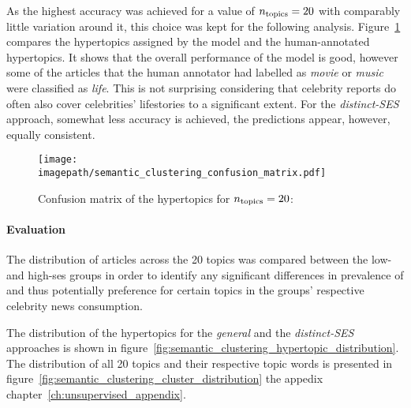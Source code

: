 As the highest accuracy was achieved for a value of $n_\text{topics}=20$ with comparably little variation around it, this choice was kept for the following analysis. Figure~\ref{fig:embedding_confusion_matrix} compares the hypertopics assigned by the model and the human-annotated hypertopics. It shows that the overall performance of the model is good, however some of the articles that the human annotator had labelled as \textit{movie} or \textit{music} were classified as \textit{life}. This is not surprising considering that celebrity reports do often also cover celebrities' lifestories to a significant extent. For the \textit{distinct-SES} approach, somewhat less accuracy is achieved, the predictions appear, however, equally consistent.

\begin{figure}
    \centering
    \texttt{[image: \\imagepath/semantic\_clustering\_confusion\_matrix.pdf]}
    \caption{Confusion matrix of the hypertopics for $n_\text{topics}=20$:}\label{fig:embedding_confusion_matrix}
\end{figure}

\paragraph{Evaluation}
The distribution of articles across the \SI{20}{} topics was compared between the low- and high-\gls{ses} groups in order to identify any significant differences in prevalence of and thus potentially preference for certain topics in the groups' respective celebrity news consumption.

The distribution of the hypertopics for the \textit{general} and the \textit{distinct-SES} approaches is shown in figure~\ref{fig:semantic_clustering_hypertopic_distribution}. The distribution of all \SI{20}{} topics and their respective topic words is presented in figure~\ref{fig:semantic_clustering_cluster_distribution} the appedix chapter~\ref{ch:unsupervised_appendix}.

